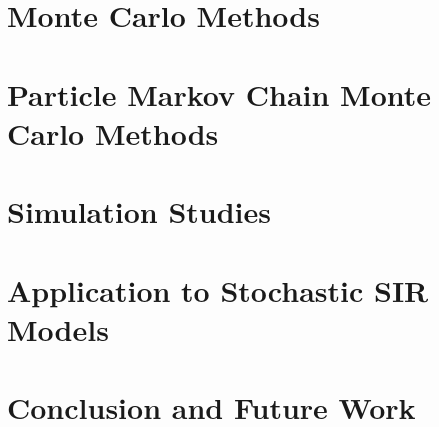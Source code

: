 \documentclass[12pt,a4paper,oneside]{memoir}
\theoremstyle{definition}
\begin{document}
	\chapter{Monte Carlo Methods}
	
	\chapter{Particle Markov Chain Monte Carlo Methods}
	
	
	
	\chapter{Simulation Studies}
	
	
	\chapter{Application to Stochastic SIR Models}
	
	
	\chapter{Conclusion and Future Work}
	
	
	
	
	
\end{document}
